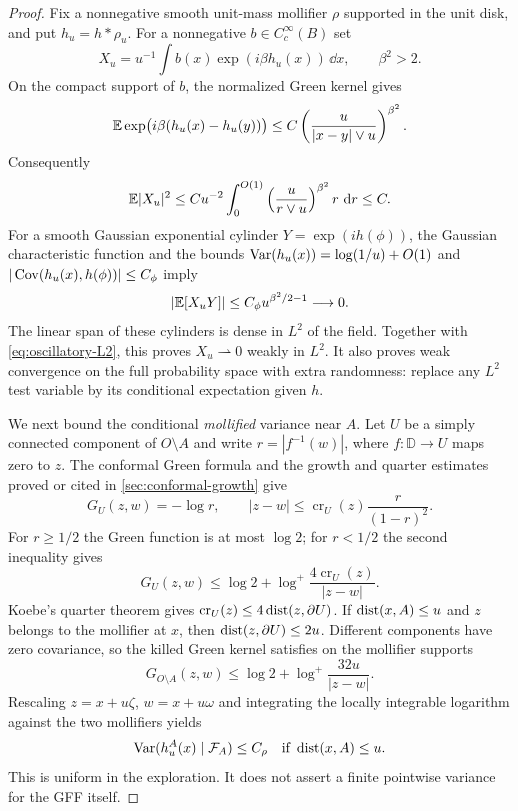 \begin{proof}
Fix a nonnegative smooth unit-mass mollifier $\rho$ supported in
the unit disk, and put $h_u=h*\rho_u$. For a nonnegative
$b\in C_c^\infty(B)$ set
\begin{equation}
 X_u=u^{-1}\int b(x)\exp(i\beta h_u(x))\,\dd x,
             \qquad \beta^2>2.
 \label{eq:flat-oscillatory}
\end{equation}
On the compact support of $b$, the normalized Green kernel gives
\[
 \mathbb E\exp\bigl(i\beta(h_u(x)-h_u(y))\bigr)
 \leq C\left(\frac{u}{|x-y|\vee u}\right)^{\beta^2}.
\]
Consequently
\begin{equation}
 \mathbb E|X_u|^2
 \leq C u^{-2}\int_0^{O(1)}
       \left(\frac{u}{r\vee u}\right)^{\beta^2}r\,\,\mathrm d r
 \leq C.
 \label{eq:oscillatory-L2}
\end{equation}
For a smooth Gaussian exponential cylinder $Y=\exp(ih(\phi))$,
the Gaussian characteristic function and the bounds
$\operatorname{Var}(h_u(x))=\log(1/u)+O(1)$ and
$|\operatorname{Cov}(h_u(x),h(\phi))|\leq C_\phi$ imply
\[
 |\mathbb E[X_uY]|\leq C_\phi u^{\beta^2/2-1}\longrightarrow0.
\]
The linear span of these cylinders is dense in $L^2$ of the field.
Together with \eqref{eq:oscillatory-L2}, this proves
$X_u\rightharpoonup0$ weakly in $L^2$. It also proves weak
convergence on the full probability space with extra randomness:
replace any $L^2$ test variable by its conditional expectation
given $h$.

We next bound the conditional \emph{mollified} variance near $A$.
Let $U$ be a simply connected component of $O\setminus A$ and
write $r=|f^{-1}(w)|$, where $f:\mathbb D\to U$ maps zero to $z$.
The conformal Green formula and the growth and quarter estimates
proved or cited in \cref{sec:conformal-growth} give
\[
 G_U(z,w)=-\log r,
 \qquad |z-w|\leq\operatorname{cr}_U(z)\frac{r}{(1-r)^2}.
\]
For $r\geq1/2$ the Green function is at most $\log2$; for
$r<1/2$ the second inequality gives
\[
 G_U(z,w)\leq\log2+
       \log^+\frac{4\operatorname{cr}_U(z)}{|z-w|}.
\]
Koebe's quarter theorem gives
$\operatorname{cr}_U(z)\leq4\operatorname{dist}(z,\partial U)$. If
$\operatorname{dist}(x,A)\leq u$ and $z$ belongs to the mollifier at $x$, then
$\operatorname{dist}(z,\partial U)\leq2u$. Different components have zero
covariance, so the killed Green kernel satisfies on the mollifier
supports
\begin{equation}
 G_{O\setminus A}(z,w)
       \leq\log2+\log^+\frac{32u}{|z-w|}.
 \label{eq:cut-green-bound}
\end{equation}
Rescaling $z=x+u\zeta$, $w=x+u\omega$ and integrating the
locally integrable logarithm against the two mollifiers yields
\begin{equation}
 \operatorname{Var}(h_u^A(x)\mid\mathcal F_A)\leq C_\rho
       \quad\text{if }\operatorname{dist}(x,A)\leq u.
 \label{eq:cut-mollified-variance}
\end{equation}
This is uniform in the exploration. It does not assert a finite
pointwise variance for the GFF itself.


\end{proof}
